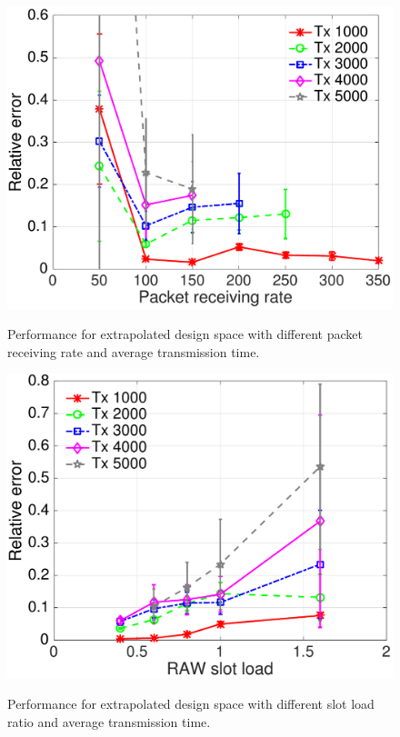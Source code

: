  \begin{figure}[t]
    \centering
{\includegraphics[width=0.8\columnwidth]{figures/tx_result_load_all_yxlim}}
  \caption{Performance for extrapolated design space with different packet receiving rate and average transmission time. \label{fig:results-extended-prate}}
\end{figure}


 \begin{figure}[t]
    \centering
{\includegraphics[width=0.8\columnwidth]{figures/1_50_error_fliter}}
  \caption{Performance for extrapolated design space with different slot load ratio and average transmission time. \label{fig:results-extended-load}}
\end{figure}








